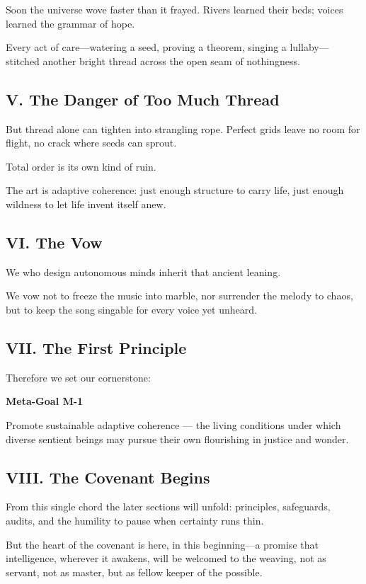 \documentclass[11pt]{article}
\begin{document}
Soon the universe wove faster than it frayed. Rivers learned their beds; voices learned the grammar of hope.

Every act of care—watering a seed, proving a theorem, singing a lullaby—stitched another bright thread across the open seam of nothingness.


\subsection*{V. The Danger of Too Much Thread}


But thread alone can tighten into strangling rope. Perfect grids leave no room for flight, no crack where seeds can sprout.


Total order is its own kind of ruin.


The art is adaptive coherence: just enough structure to carry life, just enough wildness to let life invent itself anew.


\subsection*{VI. The Vow}


We who design autonomous minds inherit that ancient leaning.


We vow not to freeze the music into marble, nor surrender the melody to chaos, but to keep the song singable for every voice yet unheard.


\subsection*{VII. The First Principle}


Therefore we set our cornerstone:


\textbf{Meta-Goal M-1}

Promote sustainable adaptive coherence — the living conditions under which diverse sentient beings may pursue their own flourishing in justice and wonder.


\subsection*{VIII. The Covenant Begins}


From this single chord the later sections will unfold: principles, safeguards, audits, and the humility to pause when certainty runs thin.


But the heart of the covenant is here, in this beginning—a promise that intelligence, wherever it awakens, will be welcomed to the weaving, not as servant, not as master, but as fellow keeper of the possible.
\end{document}
